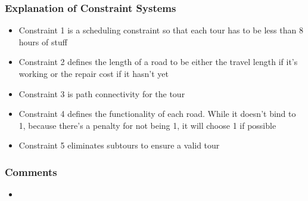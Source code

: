 \documentclass{article}
\begin{document}
	\subsubsection{Explanation of Constraint Systems}
	\begin{itemize}
		\item Constraint 1 is a scheduling constraint so that each tour has to be less than 8 hours of stuff
		\item Constraint 2 defines the length of a road to be either the travel length if it's working or the repair cost if it hasn't yet
		\item Constraint 3 is path connectivity for the tour
		\item Constraint 4 defines the functionality of each road. While it doesn't bind to 1, because there's a penalty for not being 1, it will choose 1 if possible
		\item Constraint 5 eliminates subtours to ensure a valid tour
	\end{itemize}
	\subsubsection{Comments}
	\begin{itemize}
		\item 
	\end{itemize}
		
\end{document}

